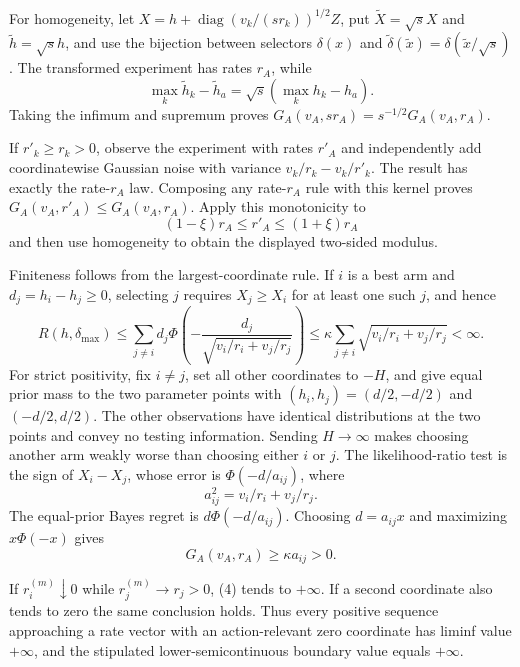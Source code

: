 For homogeneity, let \(X=h+\operatorname{diag}(v_k/(sr_k))^{1/2}Z\), put \(\widetilde X=\sqrt sX\) and \(\widetilde h=\sqrt sh\), and use the bijection between selectors \(\delta(x)\) and \(\widetilde\delta(\widetilde x)=\delta(\widetilde x/\sqrt s)\).  The transformed experiment has rates \(r_A\), while
\[
\max_k\widetilde h_k-\widetilde h_a=\sqrt s(\max_kh_k-h_a).
\]
Taking the infimum and supremum proves \(G_A(v_A,sr_A)=s^{-1/2}G_A(v_A,r_A)\).

If \(r'_k\geq r_k>0\), observe the experiment with rates \(r'_A\) and independently add coordinatewise Gaussian noise with variance \(v_k/r_k-v_k/r'_k\).  The result has exactly the rate-\(r_A\) law.  Composing any rate-\(r_A\) rule with this kernel proves \(G_A(v_A,r'_A)\leq G_A(v_A,r_A)\).  Apply this monotonicity to
\[
(1-\xi)r_A\leq r'_A\leq(1+\xi)r_A
\]
and then use homogeneity to obtain the displayed two-sided modulus.

Finiteness follows from the largest-coordinate rule.  If \(i\) is a best arm and \(d_j=h_i-h_j\geq0\), selecting \(j\) requires \(X_j\geq X_i\) for at least one such \(j\), and hence
\[
R(h,\delta_{\max})\leq\sum_{j\ne i}d_j\Phi\!\left(-\frac{d_j}{\sqrt{v_i/r_i+v_j/r_j}}\right)
\leq\kappa\sum_{j\ne i}\sqrt{v_i/r_i+v_j/r_j}<\infty. \tag{3}
\]
For strict positivity, fix \(i\ne j\), set all other coordinates to \(-H\), and give equal prior mass to the two parameter points with \((h_i,h_j)=(d/2,-d/2)\) and \((-d/2,d/2)\).  The other observations have identical distributions at the two points and convey no testing information.  Sending \(H\to\infty\) makes choosing another arm weakly worse than choosing either \(i\) or \(j\).  The likelihood-ratio test is the sign of \(X_i-X_j\), whose error is \(\Phi(-d/a_{ij})\), where
\[
a_{ij}^2=v_i/r_i+v_j/r_j.
\]
The equal-prior Bayes regret is \(d\Phi(-d/a_{ij})\).  Choosing \(d=a_{ij}x\) and maximizing \(x\Phi(-x)\) gives
\[
G_A(v_A,r_A)\geq\kappa a_{ij}>0. \tag{4}
\]

If \(r_i^{(m)}\downarrow0\) while \(r_j^{(m)}\to r_j>0\), (4) tends to \(+\infty\).  If a second coordinate also tends to zero the same conclusion holds.  Thus every positive sequence approaching a rate vector with an action-relevant zero coordinate has liminf value \(+\infty\), and the stipulated lower-semicontinuous boundary value equals \(+\infty\).